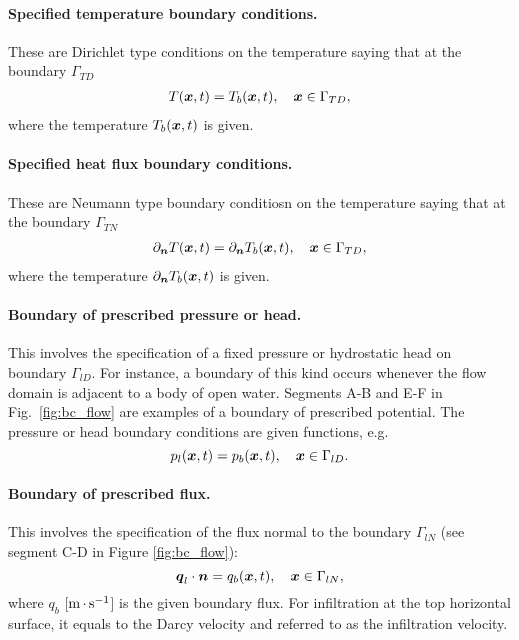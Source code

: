 \paragraph{Specified temperature boundary conditions.}
These are Dirichlet type conditions on the temperature saying 
that at the boundary $\Gamma_{TD}$
\begin{align}
  T({\boldsymbol{x}},t) = T_b({\boldsymbol{x}},t), \quad {\boldsymbol{x}}\in \Gamma_{TD}, 
\end{align}
where the temperature $T_b({\boldsymbol{x}},t)$ is given.

\paragraph{Specified heat flux boundary conditions.}
These are Neumann type boundary conditiosn on the temperature saying that
at the boundary $\Gamma_{TN}$
\begin{align}
  \partial_{\boldsymbol{n}} T({\boldsymbol{x}},t) = \partial_{\boldsymbol{n}} T_b({\boldsymbol{x}},t), \quad {\boldsymbol{x}}\in \Gamma_{TD}, 
\end{align}
where the temperature $\partial_{\boldsymbol{n}} T_b({\boldsymbol{x}},t)$ is given.





\paragraph{Boundary of prescribed pressure or head.}
This involves the specification of a fixed pressure or hydrostatic head on boundary $\Gamma_{lD}$.
For instance, a boundary of this kind occurs whenever the flow domain is adjacent to a body of open water.
Segments A-B and E-F in Fig.~\ref{fig:bc_flow} are examples of a boundary of prescribed potential.
The pressure or head boundary conditions are given functions, e.g.
\begin{equation}
\label{eq:BC pressure Darcy PS thermal}
  p_l({\boldsymbol{x}},t) = p_{b}({\boldsymbol{x}},t), \quad {\boldsymbol{x}} \in \Gamma_{lD}. 
\end{equation}

\paragraph{Boundary of prescribed flux.}
This involves the specification of the flux normal to the boundary $\Gamma_{lN}$
(see segment C-D in Figure \ref{fig:bc_flow}):
\begin{equation}
\label{eq:BC flux Darcy PS thermal}
  {\boldsymbol{q}}_l\cdot \boldsymbol{n} = q_{b}({\boldsymbol{x}},t), \quad {\boldsymbol{x}} \in \Gamma_{lN},
\end{equation}
where $q_b$ [${\rm m}{\,\cdot\,}{\rm s}^{-1}$] is the given boundary flux. 
For infiltration at the top horizontal surface, it equals to the Darcy velocity
and referred to as the infiltration velocity.

